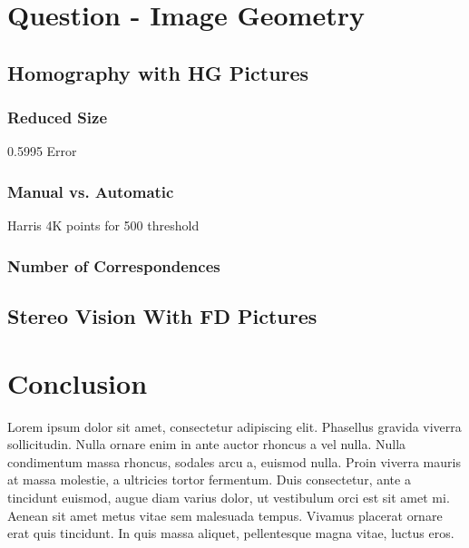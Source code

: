 \documentclass[a4paper, 10pt, conference]{ieeeconf}
\begin{document}
\section{Question - Image Geometry}
\subsection{Homography with HG Pictures}
\subsubsection{Reduced Size}
0.5995 Error
\subsubsection{Manual vs. Automatic}
Harris 4K points for 500 threshold
\subsubsection{Number of Correspondences}

\subsection{Stereo Vision With FD Pictures}


\cite{notes}


\section{Conclusion}
Lorem ipsum dolor sit amet, consectetur adipiscing elit. Phasellus gravida viverra sollicitudin. Nulla ornare enim in ante auctor rhoncus a vel nulla. Nulla condimentum massa rhoncus, sodales arcu a, euismod nulla. Proin viverra mauris at massa molestie, a ultricies tortor fermentum. Duis consectetur, ante a tincidunt euismod, augue diam varius dolor, ut vestibulum orci est sit amet mi. Aenean sit amet metus vitae sem malesuada tempus. Vivamus placerat ornare erat quis tincidunt. In quis massa aliquet, pellentesque magna vitae, luctus eros.




\onecolumn
\end{document}
